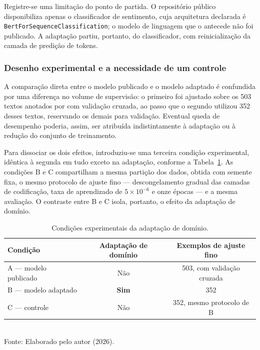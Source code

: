 Registre-se uma limitação do ponto de partida. O repositório público disponibiliza apenas o
classificador de sentimento, cuja arquitetura declarada é \texttt{BertForSequenceClassification};
o modelo de linguagem que o antecede não foi publicado. A adaptação partiu, portanto, do
classificador, com reinicialização da camada de predição de tokens.

\subsubsection{Desenho experimental e a necessidade de um controle}

A comparação direta entre o modelo publicado e o modelo adaptado é confundida por uma diferença no
volume de supervisão: o primeiro foi ajustado sobre os 503 textos anotados por
 com validação cruzada, ao passo que o segundo utilizou 352 desses
textos, reservando os demais para validação. Eventual queda de desempenho poderia, assim, ser
atribuída indistintamente à adaptação ou à redução do conjunto de treinamento.

Para dissociar os dois efeitos, introduziu-se uma terceira condição experimental, idêntica à
segunda em tudo exceto na adaptação, conforme a Tabela~\ref{tab:condicoes_adaptacao}. As condições
B e C compartilham a mesma partição dos dados, obtida com semente fixa, o mesmo protocolo de ajuste
fino --- descongelamento gradual das camadas de codificação, taxa de aprendizado de
$5 \times 10^{-6}$ e onze épocas --- e a mesma avaliação. O contraste entre B e C isola, portanto,
o efeito da adaptação de domínio.

\begin{table}[htpb]
\centering
\caption{Condições experimentais da adaptação de domínio.}
\label{tab:condicoes_adaptacao}
\begin{tabular}{l c c}
\hline
\textbf{Condição} & \textbf{Adaptação de domínio} & \textbf{Exemplos de ajuste fino} \\ \hline
A --- modelo publicado & Não & 503, com validação cruzada \\
B --- modelo adaptado  & \textbf{Sim} & 352 \\
C --- controle         & Não & 352, mesmo protocolo de B \\ \hline
\end{tabular}
\vspace{0.2cm}
{\small \\ Fonte: Elaborado pelo autor (2026).}
\end{table}

